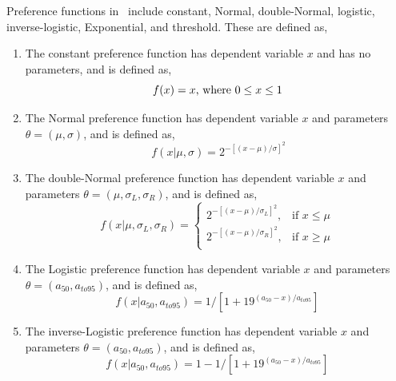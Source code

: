 Preference functions in \SPM\ include constant, Normal, double-Normal, logistic, inverse-logistic, Exponential, and threshold. These are defined as,

\begin{enumerate}
\item The constant preference function has dependent variable $x$ and has no parameters, and is defined as,
\begin{equation}
f(x)=x$, where $0 \leq x \leq 1
\end{equation}

\item The Normal preference function has dependent variable $x$ and parameters $\theta = (\mu,\sigma)$, and is defined as, 
\begin{equation}\
f(x | \mu, \sigma) = 2^{-[(x- \mu)/\sigma ]^2} 
\end{equation}
 
\item The double-Normal preference function has dependent variable $x$ and parameters $\theta=(\mu,\sigma_L,\sigma_R)$, and is defined as,
\begin{equation}
  f(x | \mu, \sigma_L, \sigma_R) = \begin{cases}
    2^{-[(x- \mu)/\sigma_L ]^2}, & \text{if $x \leq \mu$} \\
    2^{-[(x- \mu)/\sigma_R ]^2}, & \text{if $x \ge \mu$}\\
  \end{cases}
\end{equation} 

\item The Logistic preference function  has dependent variable $x$ and parameters $\theta = (a_{50},a_{to95})$, and is defined as,
\begin{equation}
  f(x | a_{50}, a_{to95}) = 1 / [1+19^{(a_{50}-x)/a_{to95}}]
\end{equation}

\item The inverse-Logistic preference function has dependent variable $x$ and parameters $\theta = (a_{50},a_{to95})$, and is defined as,
\begin{equation}
  f(x | a_{50}, a_{to95}) =1- 1 / [1+19^{(a_{50}-x)/a_{to95}}]
\end{equation}


\end{enumerate}
